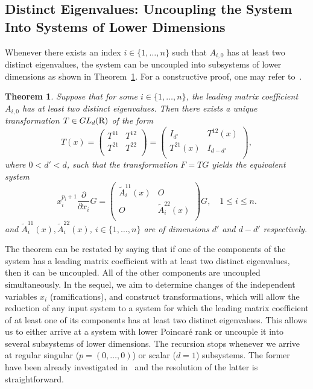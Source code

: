 \documentclass[final,1p,times,number,amsthm]{elsart}
\newtheorem{theorem}[lemma]{Theorem}
\newcommand{\pder}[2]{\frac{\partial}{\partial #2}#1}
\begin{document}
\subsection{Distinct Eigenvalues: Uncoupling the System Into Systems 
of Lower Dimensions}
\label{diagpfaff}
Whenever there exists an index $i \in\{1,\dots,n \}$ such that $A_{i,0}$ has at
least two distinct eigenvalues, the system can be uncoupled into subsystems of
lower dimensions as shown in Theorem~\ref{blockpfaff}. For a constructive proof,
one may refer to~\cite[Section 5.2, pp 233]{key1}.
\begin{theorem}\label{blockpfaff}
  Suppose that for some $i \in\{ 1,\dots,n \}$, the leading matrix coefficient
  $A_{i,0}$ has at least two distinct eigenvalues. Then there exists a unique
  transformation $T \in GL_d({\rm R})$ of the form
  \[T{(x)} =\left(
    \begin{matrix}
      T^{11} &   T^{12} \\
      T^{21} & T^{22}\\
    \end{matrix}\right)=\left(
    \begin{matrix}
      I_{d'} &   T^{12}{(x)} \\
      T^{21}{(x)} & I_{d-d'}\\
    \end{matrix}\right),
  \]
where $0< d'< d$, such that the transformation $F = T G$ yields
  the equivalent system
  \[x_{i}^{p_{i} +1} \pder{G}{x_i} = \left(
    \begin{matrix}
      \tilde{A}^{11}_{i}(x) & O\\
      O &     \tilde{A}^{22}_{i}(x)\\
    \end{matrix}\right)G, \quad 1 \leq i \leq n .
  \]
  and $\tilde{A}^{11}_{i}(x),\tilde{A}^{22}_{i} (x)$, $i \in \{ 1, \dots, n\}$
  are of dimensions $d'$ and $d-d'$ respectively. 
\end{theorem}
The theorem can be restated by saying that if one of the components of the
system has a leading matrix coefficient with at least two distinct eigenvalues,
then it can be uncoupled. All of the other components are uncoupled
simultaneously. In the sequel, we aim to determine changes of the independent
variables $x_i$ (ramifications), and construct transformations, which will allow
the reduction of any input system to a system for which the leading matrix
coefficient of at least one of its components has at least two distinct
eigenvalues. This allows us to either arrive at a system with lower Poincar\'e
rank or uncouple it into several subsystems of lower dimensions. The
recursion stops whenever we arrive at regular singular ($p =(0, \dots, 0)$) or scalar
($d=1$) subsystems. The former have been already investigated in~\cite[Chapter
3]{key73} and the resolution of the latter is straightforward.
\end{document}
